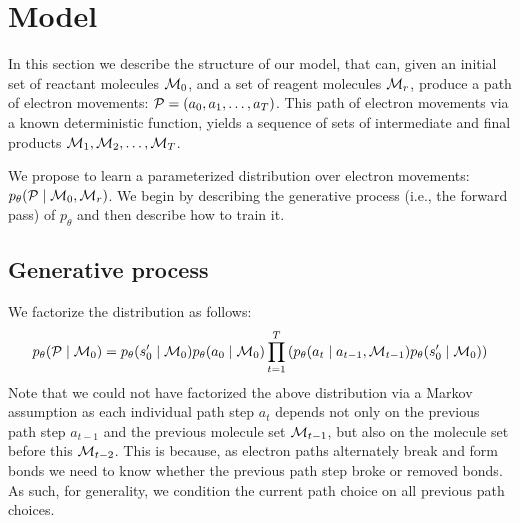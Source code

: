 
\section{Model}
In this section we describe the structure of our model, that can, given an initial set of reactant molecules ${\mathcal{M}}_0$, and a set of reagent molecules ${\mathcal{M}}_r$, produce a path of electron movements: ${\mathcal{P}} = (a_0, a_1, \ldots, a_{T})$. This path of electron movements via a known deterministic function, yields a sequence of sets of intermediate and final products ${\mathcal{M}}_1, {\mathcal{M}}_2, \ldots, {\mathcal{M}}_T$. 

We propose to learn a parameterized distribution over electron movements: $p_\theta( {\mathcal{P}} \mid {\mathcal{M}}_0, {\mathcal{M}}_r)$. We begin by describing the generative process (i.e., the forward pass) of $p_\theta$ and then describe how to train it.







\subsection{Generative process}
We factorize the distribution as follows:
\begin{align}
p_\theta({\mathcal{P}} \mid {\mathcal{M}}_0) = p_\theta(s_{0}' \mid {\mathcal{M}}_0) p_\theta(a_{0} \mid {\mathcal{M}}_0) \prod_{t=1}^{T} \left( p_\theta(a_{t} \mid a_{t-1}, {\mathcal{M}}_{t-1} ) p_\theta(s_{0}' \mid {\mathcal{M}}_0) \right) \nonumber
\end{align}
Note that we could not have factorized the above distribution via a Markov assumption as each individual path step $a_t$ depends not only on the previous path step $a_{t-1}$ and the previous molecule set ${\mathcal{M}}_{t-1}$, but also on the molecule set before this ${\mathcal{M}}_{t-2}$. This is because, as electron paths alternately break and form bonds we need to know whether the previous path step broke or removed bonds. As such, for generality, we condition the current path choice on all previous path choices.

